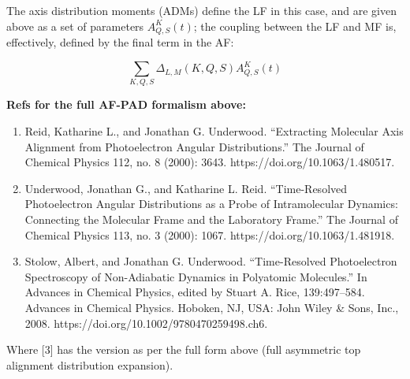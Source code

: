 The axis distribution moments (ADMs) define the LF in this case, and are
given above as a set of parameters \(A_{Q,S}^{K}(t)\); the coupling
between the LF and MF is, effectively, defined by the final term in the
AF:

\begin{equation}
\sum_{K,Q,S}\Delta_{L,M}(K,Q,S)A_{Q,S}^{K}(t)
\end{equation}

\textbf{Refs for the full AF-PAD formalism above:}

\begin{enumerate}
\def\labelenumi{\arabic{enumi}.}
\item
  Reid, Katharine L., and Jonathan G. Underwood. ``Extracting Molecular
  Axis Alignment from Photoelectron Angular Distributions.'' The Journal
  of Chemical Physics 112, no. 8 (2000): 3643.
  https://doi.org/10.1063/1.480517.
\item
  Underwood, Jonathan G., and Katharine L. Reid. ``Time-Resolved
  Photoelectron Angular Distributions as a Probe of Intramolecular
  Dynamics: Connecting the Molecular Frame and the Laboratory Frame.''
  The Journal of Chemical Physics 113, no. 3 (2000): 1067.
  https://doi.org/10.1063/1.481918.
\item
  Stolow, Albert, and Jonathan G. Underwood. ``Time-Resolved
  Photoelectron Spectroscopy of Non-Adiabatic Dynamics in Polyatomic
  Molecules.'' In Advances in Chemical Physics, edited by Stuart A.
  Rice, 139:497--584. Advances in Chemical Physics. Hoboken, NJ, USA:
  John Wiley \& Sons, Inc., 2008.
  https://doi.org/10.1002/9780470259498.ch6.
\end{enumerate}

Where {[}3{]} has the version as per the full form above (full
asymmetric top alignment distribution expansion).